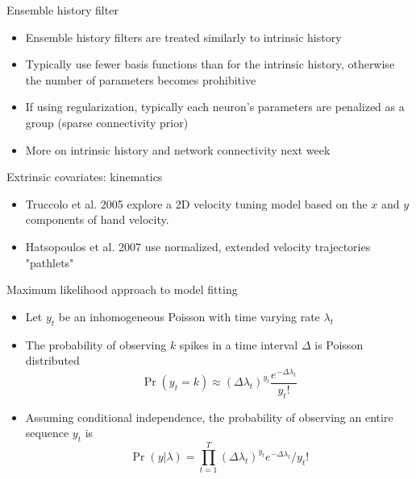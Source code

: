 \documentclass[svgnames,13pt]{beamer}
\begin{document}
\begin{frame}{Ensemble history filter}
\begin{itemize}
	\item <1->Ensemble history filters are treated similarly to intrinsic history
	\item <2->Typically use fewer basis functions than for the intrinsic history, otherwise the number of parameters becomes prohibitive
	\item <3->If using regularization, typically each neuron's parameters are penalized as a group (sparse connectivity prior)
	\item <4->More on intrinsic history and network connectivity next week
\end{itemize}
\end{frame} 

\begin{frame}{Extrinsic covariates: kinematics}
\begin{itemize}
	\item <1->Truccolo et al. 2005 explore a 2D velocity tuning model based on the $x$ and $y$ components of hand velocity. 
	\item <2->Hatsopoulos et al. 2007 use normalized, extended velocity trajectories "pathlets"
\end{itemize}
\end{frame} 

\begin{frame}{Maximum likelihood approach to model fitting}
\begin{itemize}
	\item <1->Let $y_t$ be an inhomogeneous Poisson with time varying rate $\lambda_t$
	\item <2->The probability of observing $k$ spikes in a time interval $\Delta$ is Poisson distributed\[\Pr(y_t=k) \approx (\Delta \lambda_t)^{y_t} \frac{ e^{-\Delta \lambda_t}}{y_t!}\]
	\item <3->Assuming conditional independence, the probability of observing an entire sequence $y_t$ is \[\Pr(y|\lambda) = \prod_{t=1}^T (\Delta\lambda_t)^{y_t} e^{-\Delta\lambda_t} / {y_t}! \]
\end{itemize}
\end{frame} 
\end{document}
